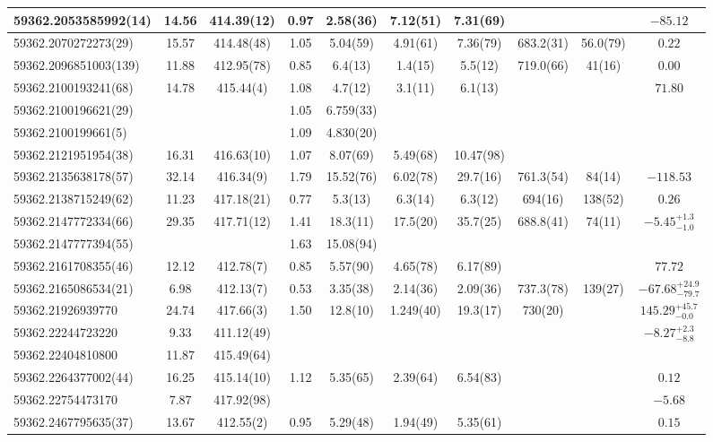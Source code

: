 \documentclass[preprint2, trackchanges]{aastex631}
\begin{document}
{{\begin{longtable}{lccccccccc}
\hline
59362.2053585992(14) & 14.56 & 414.39(12) & 0.97 & 2.58(36) & 7.12(51)  & 7.31(69) &  &  & $-85.12$ \\
\hline
59362.2070272273(29) & 15.57 & 414.48(48) & 1.05 & 5.04(59) & 4.91(61)  & 7.36(79) & 683.2(31) & 56.0(79) & $0.22$ \\
\hline
59362.2096851003(139) & 11.88 & 412.95(78) & 0.85 & 6.4(13) & 1.4(15)  & 5.5(12) & 719.0(66) & 41(16) & $0.00$ \\
\hline
59362.2100193241(68) & 14.78 & 415.44(4) & 1.08 & 4.7(12) & 3.1(11)  & 6.1(13) &  &  & $71.80$ \\
59362.2100196621(29)  &  & & 1.05 & 6.759(33) &  &  &    &  &  \\
59362.2100199661(5)  &  & & 1.09 & 4.830(20) &  &  &    &  &  \\
\hline
59362.2121951954(38) & 16.31 & 416.63(10) & 1.07 & 8.07(69) & 5.49(68)  & 10.47(98) &  &  &  \\
\hline
59362.2135638178(57) & 32.14 & 416.34(9) & 1.79 & 15.52(76) & 6.02(78)  & 29.7(16) & 761.3(54) & 84(14) & $-118.53$ \\
\hline
59362.2138715249(62) & 11.23 & 417.18(21) & 0.77 & 5.3(13) & 6.3(14)  & 6.3(12) & 694(16) & 138(52) & $0.26$ \\
\hline
59362.2147772334(66) & 29.35 & 417.71(12) & 1.41 & 18.3(11) & 17.5(20)  & 35.7(25) & 688.8(41) & 74(11) & $-5.45^{+1.3}_{-1.0}$ \\
59362.2147777394(55) & &  & 1.63 & 15.08(94) &  &  &  &  &  \\
\hline
59362.2161708355(46) & 12.12 & 412.78(7) & 0.85 & 5.57(90) & 4.65(78)  & 6.17(89) &  &  & $77.72$ \\
\hline
59362.2165086534(21) & 6.98 & 412.13(7) & 0.53 & 3.35(38) & 2.14(36)  & 2.09(36) & 737.3(78) & 139(27) & $-67.68^{+24.9}_{-79.7}$ \\
\hline
59362.21926939770 & 24.74 & 417.66(3) & 1.50 & 12.8(10) & 1.249(40)  & 19.3(17) & 730(20) &  & $145.29^{+45.7}_{-0.0}$ \\
\hline
59362.22244723220 & 9.33 & 411.12(49) &  &  &    &  &  &  & $-8.27^{+2.3}_{-8.8}$ \\
\hline
59362.22404810800 & 11.87 & 415.49(64) &  &  &  &  &  &  &  \\
\hline
59362.2264377002(44) & 16.25 & 415.14(10) & 1.12 & 5.35(65) & 2.39(64)  & 6.54(83) &  &  & $0.12$ \\
\hline
59362.22754473170 & 7.87 & 417.92(98) &  &  & 
&  &  &  & $-5.68$ \\
\hline
59362.2467795635(37) & 13.67 & 412.55(2) & 0.95 & 5.29(48) & 1.94(49)  & 5.35(61) &  &  & $0.15$ \\

\end{longtable}}}
\end{document}
